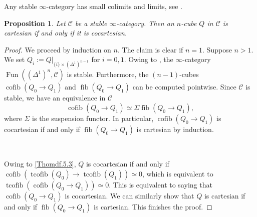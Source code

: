 \documentclass[11pt, a4paper]{amsart}
\newtheorem{prop}[thm]{Proposition}
\theoremstyle{definition}
\numberwithin{equation}{subsection}
\newcommand{\cC}{\mathcal{C}}
\newcommand{\Fun}{\operatorname{Fun}}
\newcommand{\cofib}{\operatorname{cofib}}
\newcommand{\tcofib}{\operatorname{tcofib}}
\newcommand{\fib}{\operatorname{fib}}
\begin{document}
Any stable $\infty$-category has small colimits and limits, see \cite[Proposition 1.1.3.4]{HA}.

\begin{prop}
\label{Thomdf.15}
Let $\cC$ be a stable $\infty$-category.
Then an $n$-cube $Q$ in $\cC$ is cartesian if and only if it is cocartesian.
\end{prop}
\begin{proof}
We proceed by induction on $n$.
The claim is clear if $n=1$.
Suppose $n>1$.
We set $Q_i:=Q|_{\{i\}\times (\Delta^1)^{n-1}}$ for $i=0,1$.
Owing to \cite[Proposition 1.1.3.1]{HA}, the $\infty$-category $\Fun((\Delta^1)^n,\cC)$ is stable.
Furthermore, the $(n-1)$-cubes $\cofib(Q_0\to Q_1)$ and $\fib(Q_0\to Q_1)$ can be computed pointwise.
Since $\cC$ is stable, we have an equivalence in $\cC$
\[
\cofib(Q_0\to Q_1)\simeq  \Sigma \fib(Q_0\to Q_1),
\]
where $\Sigma$ is the suspension functor.
In particular, $\cofib(Q_0\to Q_1)$ is cocartesian if and only if $\fib(Q_0\to Q_1)$ is cartesian by induction.

\ 

Owing to \eqref{Thomdf.5.3}, $Q$ is cocartesian if and only if $\cofib(\tcofib(Q_0)\to \tcofib(Q_1))\simeq 0$, 
which is equivalent to $\tcofib(\cofib(Q_0\to Q_1))\simeq 0$.
This is equivalent to saying that $\cofib(Q_0\to Q_1)$ is cocartesian.
We can similarly show that $Q$ is cartesian if and only if $\fib(Q_0\to Q_1)$ is cartesian.
This finishes the proof.
\end{proof}




\newpage




\newpage

\printindex
\printindex[notation]
\newpage
\end{document}
